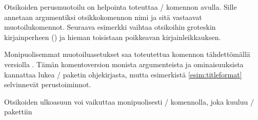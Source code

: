 Otsikoiden perusmuotoilu on helpointa toteuttaa
\-/ komennon avulla. Sille annetaan argumentiksi
otsikkokomennon nimi ja sitä vastaavat muotoilukomennot. Seuraava
esimerkki vaihtaa otsikoihin groteskin kirjainperheen
() ja hieman toisistaan poikkeavan kirjainleikkauksen.

\begin{koodilohkosis}
  \titleformat*{\section}      {\sffamily\bfseries\Large}
  \titleformat*{\subsection}   {\sffamily\bfseries\itshape\large}
  \titleformat*{\subsubsection}{\sffamily\bfseries\normalsize}
\end{koodilohkosis}

Monipuolisemmat muotoiluasetukset saa toteutettua komennon tähdettömällä
versiolla . Tämän komentoversion monista
argumenteista ja ominaisuuksista kannattaa lukea \-/
paketin ohjekirjasta, mutta esimerkistä \ref{esim:titleformat}
selvinnevät perustoiminnot.

\begin{esimerkki*}

\begin{koodilohko}
  \titleformat{\section}     %
  [hang]                     %
  {\sffamily\bfseries\Large  %
    \raggedright}
  {\thesection}              %
  {.8em}                     %
  {}                         %
  []                         %
\end{koodilohko}
\caption{Otsikoiden ulkoasuun voi vaikuttaa monipuolisesti
  \-/ komennolla, joka kuuluu \-/
  pakettiin}
\label{esim:titleformat}
\end{esimerkki*}

